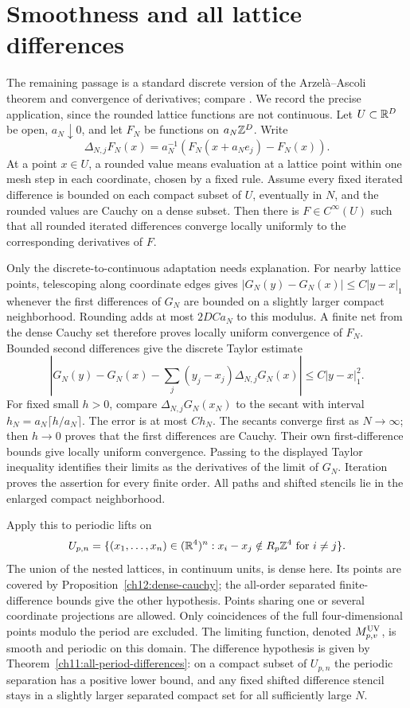 \section{Smoothness and all lattice differences}
\label{ch12:smooth}

The remaining passage is a standard discrete version of the
Arzel\`a--Ascoli theorem and convergence of derivatives; compare
\cite[Theorems~7.17 and~7.25]{Rudin1976}. We record the precise
application, since the rounded lattice functions are not continuous.
Let $U\subset\mathbb R^D$ be open, $a_N\downarrow0$, and let $F_N$ be
functions on $a_N\mathbb Z^D$. Write
\[
 \Delta_{N,j}F_N(x)=a_N^{-1}(F_N(x+a_Ne_j)-F_N(x)).
\]
At a point $x\in U$, a rounded value means evaluation at a lattice point
within one mesh step in each coordinate, chosen by a fixed rule. Assume every fixed iterated difference is bounded on each compact
subset of $U$, eventually in $N$, and the rounded values are Cauchy
on a dense subset. Then there is $F\in C^\infty(U)$ such that all
rounded iterated differences converge locally uniformly to the
corresponding derivatives of $F$.

Only the discrete-to-continuous adaptation needs explanation. For
nearby lattice points, telescoping along coordinate edges gives
$|G_N(y)-G_N(x)|\le C|y-x|_1$ whenever the first differences of $G_N$
are bounded on a slightly larger compact neighborhood. Rounding adds
at most $2DCa_N$ to this modulus. A finite net from the dense Cauchy
set therefore proves locally uniform convergence of $F_N$.
Bounded second differences give the discrete Taylor estimate
\[
 |G_N(y)-G_N(x)-\sum_j(y_j-x_j)\Delta_{N,j}G_N(x)|
       \le C|y-x|_1^2.
\]
For fixed small $h>0$, compare $\Delta_{N,j}G_N(x_N)$ to the secant
with interval $h_N=a_N\lceil h/a_N\rceil$. The error is at most
$Ch_N$. The secants converge first as $N\to\infty$; then $h\to0$
proves that the first differences are Cauchy. Their own first-difference
bounds give locally uniform convergence. Passing to the displayed
Taylor inequality identifies their limits as the derivatives of the
limit of $G_N$. Iteration proves the assertion for every finite order.
All paths and shifted stencils lie in the enlarged compact neighborhood.

Apply this to periodic lifts on
\[
 U_{p,n}=\{(x_1,\ldots,x_n)\in(\mathbb R^4)^n:
                         x_i-x_j\notin R_p\mathbb Z^4\text{ for }i\ne j\}.
\]
The union of the nested lattices, in continuum units, is dense here. Its points
are covered by Proposition~\ref{ch12:dense-cauchy}; the all-order separated
finite-difference bounds give the other hypothesis. Points sharing
one or several coordinate projections are allowed. Only coincidences
of the full four-dimensional points modulo the period are excluded.
The limiting function, denoted $M^{\rm UV}_{p,v}$, is smooth and
periodic on this domain.
The difference hypothesis is given by
Theorem~\ref{ch11:all-period-differences}: on a compact subset
of $U_{p,n}$ the periodic separation has a positive lower bound,
and any fixed shifted difference stencil stays in a slightly
larger separated compact set for all sufficiently large $N$.

